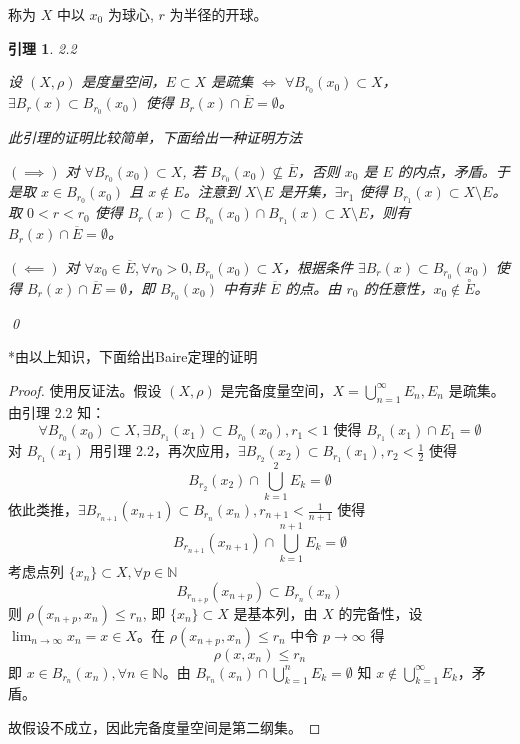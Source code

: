 \documentclass[12pt]{ctexart}
\newtheorem*{lemma}{引理}
\begin{document}
称为 $X$ 中以 $x_0$ 为球心, $r$ 为半径的开球。

\begin{lemma}2.2

设 $(X, \rho)$ 是度量空间，$E \subset X$ 是疏集 $\iff$ $\forall B_{r_0}(x_0) \subset X$，$\exists B_r(x) \subset B_{r_0}(x_0)$ 使得 $B_r(x) \cap \overline{E} = \emptyset$。

此引理的证明比较简单，下面给出一种证明方法

$(\implies)$ 对 $\forall B_{r_0}(x_0) \subset X$, 若 $B_{r_0}(x_0) \nsubseteq \overline{E}$，否则 $x_0$ 是 $E$ 的内点，矛盾。于是取 $x \in B_{r_0}(x_0)$ 且 $x \notin E$。注意到 $X \setminus E$ 是开集，$\exists r_1$ 使得 $B_{r_1}(x) \subset X \setminus E$。取 $0 < r < r_0$ 使得 $B_r(x) \subset B_{r_0}(x_0) \cap B_{r_1}(x) \subset X \setminus E$，则有 $B_r(x) \cap \overline{E} = \emptyset$。

$(\impliedby)$ 对 $\forall x_0 \in \overline{E}, \forall r_0 > 0, B_{r_0}(x_0) \subset X$，根据条件 $\exists B_r(x) \subset B_{r_0}(x_0)$ 使得 $B_r(x) \cap \overline{E} = \emptyset$，即 $B_{r_0}(x_0)$ 中有非 $\overline{E}$ 的点。由 $r_0$ 的任意性，$x_0 \notin \overset{\circ}{E}$。

\qed

\end{lemma}


\noindent **由以上知识，下面给出Baire定理的证明\cite{key3}
\begin{proof}
使用反证法。假设 $(X, \rho)$ 是完备度量空间，$X = \bigcup_{n=1}^\infty E_n, E_n$ 是疏集。由引理 2.2 知：
\[
\forall B_{r_0}(x_0) \subset X, \exists B_{r_1}(x_1) \subset B_{r_0}(x_0), r_1 < 1 \text{ 使得 } B_{r_1}(x_1) \cap E_1 = \emptyset
\]
对 $B_{r_1}(x_1)$ 用引理 2.2，再次应用，$\exists B_{r_2}(x_2) \subset B_{r_1}(x_1), r_2 < \frac{1}{2}$ 使得
\[
B_{r_2}(x_2) \cap \bigcup_{k=1}^2 E_k = \emptyset
\]
依此类推，$\exists B_{r_{n+1}}(x_{n+1}) \subset B_{r_n}(x_n), r_{n+1} < \frac{1}{n+1}$ 使得
\[
B_{r_{n+1}}(x_{n+1}) \cap \bigcup_{k=1}^{n+1} E_k = \emptyset
\]
考虑点列 $\{x_n\} \subset X, \forall p \in \mathbb{N}$
\[
B_{r_{n+p}}(x_{n+p}) \subset B_{r_n}(x_n)
\]
则 $\rho(x_{n+p}, x_n) \leq r_n$, 即 $\{x_n\} \subset X$ 是基本列，由 $X$ 的完备性，设 $\lim_{n \to \infty} x_n = x \in X$。在 $\rho(x_{n+p}, x_n) \leq r_n$ 中令 $p \to \infty$ 得
\[
\rho(x, x_n) \leq r_n
\]
即 $x \in B_{r_n}(x_n), \forall n \in \mathbb{N}$。由 $B_{r_n}(x_n) \cap \bigcup_{k=1}^n E_k = \emptyset$ 知 $x \notin \bigcup_{k=1}^\infty E_k$，矛盾。

故假设不成立，因此完备度量空间是第二纲集。
\end{proof}
\end{document}
